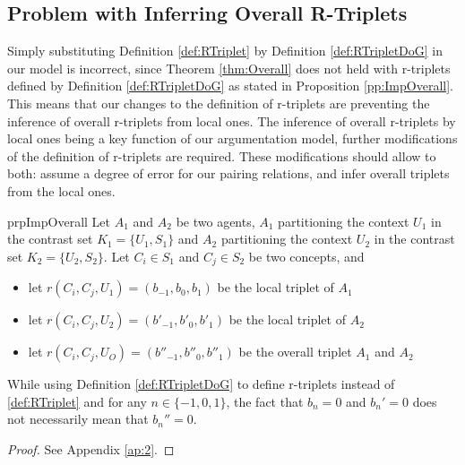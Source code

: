 \subsection{Problem with Inferring Overall R-Triplets}

Simply substituting Definition \ref{def:RTriplet} by Definition \ref{def:RTripletDoG} in our model is incorrect, since Theorem \ref{thm:Overall} does not held with r-triplets defined by Definition \ref{def:RTripletDoG} as stated in Proposition \ref{pp:ImpOverall}. This means that our changes to the definition of r-triplets are preventing the inference of overall r-triplets from local ones. The inference of overall r-triplets by local ones being a key function of our argumentation model, further modifications of the definition of r-triplets are required. These modifications should allow to both: assume a degree of error for our pairing relations, and infer overall triplets from the local ones.

\begin{restatable}{prp}{ImpOverall}\label{pp:ImpOverall}
Let $A_{1}$ and $A_{2}$ be two  agents, $A_{1}$ partitioning the context $U_{1}$ in the contrast set $K_{1} = \{ U_{1}, S_{1} \}$ and $A_{2}$ partitioning the context $U_{2}$ in the contrast set $K_{2} = \{ U_{2}, S_{2}\}$. Let $C_{i} \in S_{1}$ and $C_{j} \in S_{2}$ be two concepts, and

\begin{itemize}
\item let $r(C_{i},C_{j},U_{1}) = (b_{-1}, b_{0}, b_{1})$ be the local triplet of $A_{1}$
\item let $r(C_{i},C_{j},U_{2}) = (b'_{-1}, b'_{0}, b'_{1})$ be the local triplet of $A_{2}$
\item  let $r(C_{i}, C_{j}, U_{O}) = (b''_{-1}, b''_{0}, b''_{1})$ be the overall triplet $A_{1}$ and $A_{2}$
\end{itemize}

While using Definition \ref{def:RTripletDoG} to define r-triplets instead of \ref{def:RTriplet} and for any $n \in \{-1, 0, 1\}$, the fact that $b_{n} = 0$ and $b_{n}' = 0$ does not necessarily mean that $b_{n}'' = 0$.
\end{restatable}

\begin{proof}
See Appendix \ref{ap:2}.
\end{proof}

